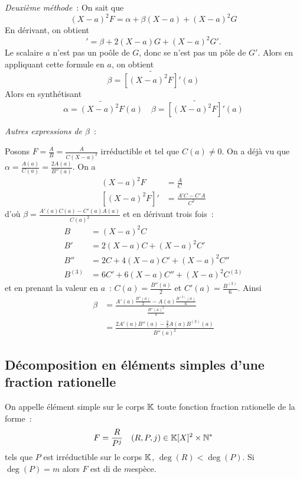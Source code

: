 \emph{Deuxième méthode}~: On sait que
\begin{equation}
  (X-a)^2F=\alpha+\beta(X-a)+(X-a)^2G
\end{equation}
En dérivant, on obtient
\begin{equation}
  [(X-a)^2F]'=\beta+2(X-a)G+(X-a)^2G'.
\end{equation}
Le scalaire $a$ n'est pas un poôle de $G$, donc se n'est pas un pôle de $G'$. Alors en appliquant cette formule en $a$, on obtient
\begin{equation}
  \beta = \widetilde{[(X-a)^2F]'}(a)
\end{equation}
Alors en synthétisant
\begin{equation}
  \alpha=\widetilde{(X-a)^2F}(a) \quad  \beta = \widetilde{[(X-a)^2F]'}(a)
\end{equation}

\emph{Autres expressions de $\beta$}~:

Posons $F = \frac{A}{B}=\frac{A}{C(X-a)^2}$ irréductible et tel que $C(a)\neq 0$. On a déjà vu que $\alpha=\frac{A(a)}{C(a)}=\frac{2A(a)}{B''(a)}$. On a
\begin{align}
  (X-a)^2F&=\frac{A}{C}\\
  [(X-a)^2F]' &=\frac{A'C-C'A}{C^2}
\end{align}
d'où $\beta = \frac{A'(a)C(a)-C'(a)A(a)}{C(a)^2}$ et en dérivant trois fois~:
\begin{align}
  B&=(X-a)^2C \\
  B'&=2(X-a)C+(X-a)^2C'\\
  B''&=2C+4(X-a)C'+(X-a)^2C''\\
  B^{(3)}&=6C'+6(X-a)C''+(X-a)^2C^{(3)}
\end{align}
et en prenant la valeur en $a$~: $C(a)=\frac{B''(a)}{2}$ et $C'(a)=\frac{B^{(3)}}{6}$. Ainsi
\begin{align}
  \beta &= \frac{A'(a)\frac{B''(a)}{2}-A(a)\frac{B^{(3)}(a)}{6}}{\frac{B''(a)^2}{4}}\\
  &=\frac{2A'(a)B''(a)-\frac{2}{3}A(a)B^{(3)}(a)}{B''(a)^2}
\end{align}

\subsection[Décomposition en éléments simples]{Décomposition en éléments simples d'une fraction rationelle}

\begin{defdef}
  On appelle élément simple sur le corps $\mathbb{K}$ toute fonction fraction rationelle de la forme~:
  \begin{equation}
    F=\frac{R}{P^j} \quad (R,P,j) \in \mathbb{K}[X]^2\times \mathbb{N}^*
  \end{equation}
  tels que $P$ est irréductible sur le corps $\mathbb{K}$, $\deg(R) < \deg(P)$. Si $\deg(P)=m$ alors $F$ est di de $m$\ieme espèce.
\end{defdef}

